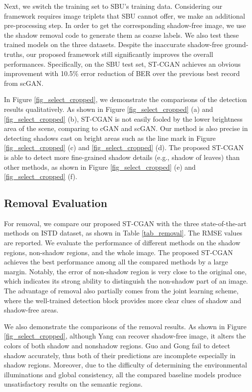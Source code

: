 \documentclass[10pt,twocolumn,letterpaper]{article}
\begin{document}
Next, we switch the training set to SBU's training data. Considering our framework requires image triplets that SBU cannot offer, we make an additional pre-processing step. In order to get the corresponding shadow-free image, we use the shadow removal code \cite{guo2013paired} to generate them as coarse labels. We also test these trained models on the three datasets. Despite the inaccurate shadow-free ground-truths, our proposed framework still significantly improves the overall performances. Specifically, on the SBU test set, ST-CGAN achieves an obvious improvement with 10.5\% error reduction of BER over the previous best record from scGAN.

In Figure \ref{fig_select_cropped}, we demonstrate the comparisons of the detection results qualitatively. As shown in Figure \ref{fig_select_cropped} (a) and \ref{fig_select_cropped} (b), ST-CGAN is not easily fooled by the lower brightness area of the scene, comparing to cGAN and scGAN. Our method is also precise in detecting shadows cast on bright areas such as the line mark in Figure \ref{fig_select_cropped} (c) and \ref{fig_select_cropped} (d). The proposed ST-CGAN is able to detect more fine-grained shadow details (e.g., shadow of leaves) than other methods, as shown in Figure \ref{fig_select_cropped} (e) and \ref{fig_select_cropped} (f).

\subsection{Removal Evaluation}
For removal, we compare our proposed ST-CGAN with the three state-of-the-art methods on ISTD dataset, as shown in Table \ref{tab_removal}. The RMSE values are reported. We evaluate the performance of different methods on the shadow regions, non-shadow regions, and the whole image. The proposed ST-CGAN achieves the best performance among all the compared methods by a large margin. Notably, the error of non-shadow region is very close to the original one, which indicates its strong ability to distinguish the non-shadow part of an image. The advantage of removal also partially comes from the joint learning scheme, where the well-trained detection block provides more clear clues of shadow and shadow-free areas. 

We also demonstrate the comparisons of the removal results. As shown in Figure \ref{fig_select_cropped}, although Yang \cite{yang2012shadow} can recover shadow-free image, it alters the colors of both shadow and nonshadow regions. Guo \cite{guo2011single} and Gong \cite{gong2014interactive} fail to detect shadow accurately, thus both of their predictions are incomplete especially in shadow regions. Moreover, due to the difficulty of determining the environmental illuminations and global consistency, all the compared baseline models produce unsatisfactory results on the semantic regions.
\end{document}
